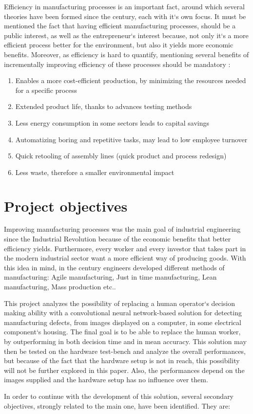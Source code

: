 \documentclass[12pt,a4paper,twoside]{report}
\begin{document}
Efficiency in manufacturing processes is an important fact, around which several theories have been formed since the  century, each with it`s own focus. It must be mentioned the fact that having efficient manufacturing processes, should be a public interest, as well as the entrepreneur`s interest because, not only it`s a more efficient process better for the environment, but also it yields more economic benefits. Moreover, as efficiency is hard to quantify, mentioning several benefits of incrementally improving efficiency of these processes should be mandatory
\cite{article-manufef}\cite{book-historymanu2}:
\begin{enumerate}
  \item Enables a more cost-efficient production, by minimizing the resources needed for a specific process
  \item Extended product life, thanks to advances testing methods
  \item Less energy consumption in some sectors leads to capital savings
  \item Automatizing boring and repetitive tasks, may lead to low employee turnover
  \item Quick retooling of assembly lines (quick product and process redesign)
  \item Less waste, therefore a smaller environmental impact
\end{enumerate}

\par



\section{Project objectives}

Improving manufacturing processes was the main goal of industrial engineering since the Industrial Revolution because of the economic benefits that better efficiency yields. Furthermore, every worker and every investor that takes part in the modern industrial sector want a more efficient way of producing goods. With this idea in mind, in the  century engineers developed different methods of manufacturing: Agile manufacturing, Just in time manufacturing, Lean manufacturing, Mass production etc.\cite{book-historymanu}\cite{book-historymanu2}.
\par
This project analyzes the possibility of replacing a human operator`s decision making ability with a convolutional neural network-based solution for detecting manufacturing defects, from images displayed on a computer, in some electrical component`s housing. The final goal is to be able to replace the human worker, by outperforming in both decision time and in mean accuracy. This solution may then be tested on the hardware test-bench and analyze the overall performances, but because of the fact that the hardware setup is not in reach, this possibility will not be further explored in this paper. Also, the performances depend on the images supplied and the hardware setup has no influence over them.
\par
In order to continue with the development of this solution, several secondary objectives, strongly related to the main one, have been identified. They are:
\end{document}
